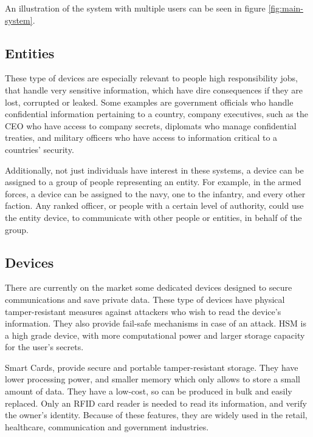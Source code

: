 An illustration of the system with multiple users can be seen in figure \ref{fig:main-system}.

\subsection{Entities} \label{chap:problem:entities}

These type of devices are especially relevant to people high responsibility jobs, that handle very sensitive information, which have dire consequences if they are lost, corrupted or leaked.
Some examples are government officials who handle confidential information pertaining to a country, company executives, such as the CEO who have access to company secrets, diplomats who manage confidential treaties, and military officers who have access to information critical to a countries' security.

Additionally, not just individuals have interest in these systems, a device can be assigned to a group of people representing an entity. For example, in the armed forces, a device can be assigned to the navy, one to the infantry, and every other faction. Any ranked officer, or people with a certain level of authority, could use the entity device, to communicate with other people or entities, in behalf of the group.

\subsection{Devices} \label{chap:problem:devices}
There are currently on the market some dedicated devices designed to secure communications and save private data.
These type of devices have physical tamper-resistant measures against attackers who wish to read the device's information. They also provide fail-safe mechanisms in case of an attack.
\ac{HSM} is a high grade device, with more computational power and larger storage capacity for the user's secrets.

Smart Cards, provide secure and portable tamper-resistant storage.
They have lower processing power, and smaller memory which only allows to store a small amount of data.
They have a low-cost, so can be produced in bulk and easily replaced. Only an RFID card reader is needed to read its information, and verify the owner's identity.
Because of these features, they are widely used in the retail, healthcare, communication and government industries.


